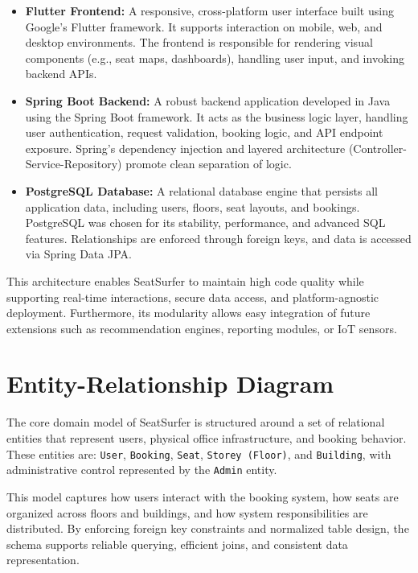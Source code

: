 \documentclass[12pt,a4paper]{report} %
\begin{document}
\begin{itemize}
    \item \textbf{Flutter Frontend:} A responsive, cross-platform user interface built using Google's Flutter framework. It supports interaction on mobile, web, and desktop environments. The frontend is responsible for rendering visual components (e.g., seat maps, dashboards), handling user input, and invoking backend APIs.

    \item \textbf{Spring Boot Backend:} A robust backend application developed in Java using the Spring Boot framework. It acts as the business logic layer, handling user authentication, request validation, booking logic, and API endpoint exposure. Spring's dependency injection and layered architecture (Controller-Service-Repository) promote clean separation of logic.

    \item \textbf{PostgreSQL Database:} A relational database engine that persists all application data, including users, floors, seat layouts, and bookings. PostgreSQL was chosen for its stability, performance, and advanced SQL features. Relationships are enforced through foreign keys, and data is accessed via Spring Data JPA.
\end{itemize}

\noindent
This architecture enables SeatSurfer to maintain high code quality while supporting real-time interactions, secure data access, and platform-agnostic deployment. Furthermore, its modularity allows easy integration of future extensions such as recommendation engines, reporting modules, or IoT sensors.

\section{Entity-Relationship Diagram}

The core domain model of SeatSurfer is structured around a set of relational entities that represent users, physical office infrastructure, and booking behavior. These entities are: \texttt{User}, \texttt{Booking}, \texttt{Seat}, \texttt{Storey (Floor)}, and \texttt{Building}, with administrative control represented by the \texttt{Admin} entity.

This model captures how users interact with the booking system, how seats are organized across floors and buildings, and how system responsibilities are distributed. By enforcing foreign key constraints and normalized table design, the schema supports reliable querying, efficient joins, and consistent data representation.
\end{document}
